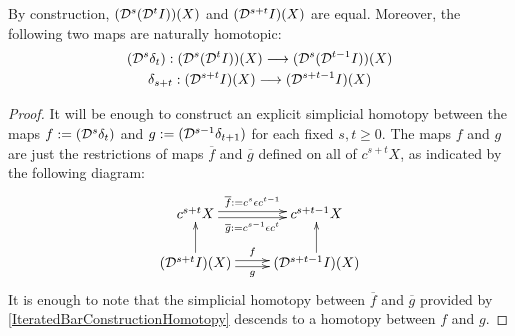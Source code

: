 \documentclass[10pt]{article}
\newcommand{\caldup}[1]{\calD^{\smash{#1}}}
\begin{document}
\begin{convergence}
\begin{lem}\label{DsDt=Dt+s}
By construction, $(\caldup{s}(\caldup{t}I))(X)$ and $(\caldup{s+t}I){(X)}$ are equal. Moreover, the following two maps are naturally homotopic:
\begin{gather*}
(\caldup{s}\delta_t):(\caldup{s}(\caldup{t}I))(X)\to (\caldup{s}(\caldup{t-1}I))(X)\\
\delta_{s+t}:(\caldup{s+t}I){(X)}\to (\caldup{s+t-1}I){(X)}
\end{gather*}
\end{lem}
\begin{proof}
It will be enough to construct an explicit simplicial homotopy between the maps $f:=(\caldup{s}\delta_t)$ and $g:=(\caldup{s-1}\delta_{t+1})$ for each fixed $s,t\geq0$. The maps $f$ and $g$ are just the restrictions of maps $\overline{f}$ and $\overline{g}$ defined on all of $c^{s+t}X$, as indicated by the following diagram:
\[\xymatrix@R=7mm{
c^{s+t}X
\ar@<.5ex>[r]^-{\overline{f}:=c^s\epsilon c^{t-1}}
\ar@<-.5ex>[r]_-{\overline{g}:=c^{s-1}\epsilon c^{t}}
&%
c^{s+t-1}X\\%
(\caldup{s+t}I)(X)
\ar@<.5ex>[r]^-{f}
\ar@<-.5ex>[r]_-{g}
\ar[u]
&%
(\caldup{s+t-1}I)(X)
\ar[u]
}\]
It is enough to note that the simplicial homotopy between $\overline{f}$ and $\overline{g}$ provided by \ref{IteratedBarConstructionHomotopy} descends to a homotopy between $f$ and $g$.
\end{proof}


\end{convergence}
\end{document}
